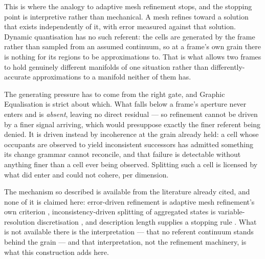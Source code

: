 \documentclass[11pt,a4paper]{article}
\theoremstyle{remark}
\begin{document}
This is where the analogy to adaptive mesh refinement stops, and the stopping point is interpretive
rather than mechanical. A mesh refines toward a solution that exists independently of it, with error
measured against that solution. Dynamic quantisation has no such referent: the cells are generated by
the frame rather than sampled from an assumed continuum, so at a frame's own grain there is nothing
for its regions to be approximations to. That is what allows two frames to hold genuinely different
manifolds of one situation rather than differently-accurate approximations to a manifold neither of
them has.

The generating pressure has to come from the right gate, and Graphic Equalisation is strict about
which. What falls below a frame's aperture never enters and is \emph{absent}, leaving no direct
residual --- so refinement cannot be driven by a finer signal arriving, which would presuppose
exactly the finer referent being denied. It is driven instead by incoherence at the grain already
held: a cell whose occupants are observed to yield inconsistent successors has admitted something its
change grammar cannot reconcile, and that failure is detectable without anything finer than a cell
ever being observed. Splitting such a cell is licensed by what did enter and could not cohere, per
dimension.

The mechanism so described is available from the literature already cited, and none of it is claimed
here: error-driven refinement is adaptive mesh refinement's own criterion \citep{berger1984},
inconsistency-driven splitting of aggregated states is variable-resolution discretisation
\citep{munos2002}, and description length supplies a stopping rule \citep{rissanen1978}. What is not
available there is the interpretation --- that no referent continuum stands behind the grain --- and
that interpretation, not the refinement machinery, is what this construction adds here.
\end{document}
